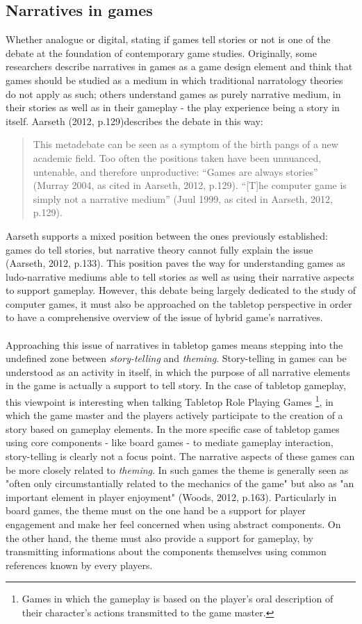 \subsection{Narratives in games}
Whether analogue or digital, stating if games tell stories or not is one of the debate at the foundation of contemporary game studies. Originally, some researchers describe narratives in games as a game design element and think that games should be studied as a medium in which traditional narratology theories do not apply as such; others understand games as purely narrative medium, in their stories as well as in their gameplay - the play experience being a story in itself. Aarseth (2012, p.129)\cite{art:aarseth}describes the debate in this way:
\begin{quotation}
This metadebate can be seen as a symptom of the birth pangs of a new academic field. Too often the positions taken have been unnuanced, untenable, and therefore unproductive: “Games are always stories” (Murray 2004, as cited in Aarseth, 2012, p.129). “[T]he computer game is simply not a narrative medium” (Juul 1999, as cited in Aarseth, 2012, p.129).
\end{quotation}
Aarseth supports a mixed position between the ones previously established: games do tell stories, but narrative theory cannot fully explain the issue (Aarseth, 2012, p.133). This position paves the way for understanding games as ludo-narrative mediums able to tell stories as well as using their narrative aspects to support gameplay. However, this debate being largely dedicated to the study of computer games, it must also be approached on the tabletop perspective in order to have a comprehensive overview of the issue of hybrid game's narratives.\\\\

Approaching this issue of narratives in tabletop games means stepping into the undefined zone between \textit{story-telling} and \textit{theming}. Story-telling in games can be understood as an activity in itself, in which the purpose of all narrative elements in the game is actually a support to tell story. In the case of tabletop gameplay, this viewpoint is interesting when talking Tabletop Role Playing Games \footnote{Games in which the gameplay is based on the player's oral description of their character's actions transmitted to the game master.}, in which the game master and the players actively participate to the creation of a story based on gameplay elements. In the more specific case of tabletop games using core components - like board games - to mediate gameplay interaction, story-telling is clearly not a focus point. The narrative aspects of these games can be more closely related to \textit{theming}. In such games the theme is generally seen as "often only circumstantially related to the mechanics of the game" but also as "an important element in player enjoyment" (Woods, 2012, p.163). Particularly in board games, the theme must on the one hand be a support for player engagement and make her feel concerned when using abstract components. On the other hand, the theme must also provide a support for gameplay, by transmitting informations about the components themselves using common references known by every players.

